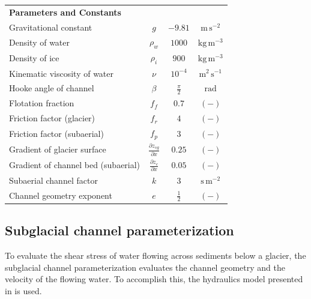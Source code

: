 \documentclass[11pt]{article}
\newcommand{\unit}[1]{$\mathrm{#1}$}
\begin{document}
\begin{spacing}{1}
\begin{table}[H]
\begin{tabular}{ l  c  c c }
      \textbf{Parameters and Constants}  & & &\\
      Gravitational constant&$g$& $-9.81$&$\mathrm{m\,s^{-2}}$\\
      Density of water & $\rho_w$& $1000$ & $\mathrm{kg\,m^{-3}}$ \\
      Density of ice & $\rho_i$& $900$ & $\mathrm{kg\,m^{-3}}$ \\
      Kinematic viscosity of water &$\nu$& $10^{-4}$& $\mathrm{m^2\,s^{-1}}$\\
      Hooke angle of channel & $\beta$ & $\frac{\pi}{2}$ & \unit{rad}\\
      Flotation fraction & $f_f$&$0.7$& $\mathrm{(-)}$\\
      Friction factor (glacier) & $f_r$ & $4$ & $\mathrm{(-)}$ \\
      Friction factor (subaerial) & $f_p$ & $3$ & $\mathrm{(-)}$\\
      Gradient of glacier surface & $\frac{\partial z_{sg}}{\partial x}$ &$0.25$& $\mathrm{(-)}$\\
      Gradient of channel bed (subaerial) &$\frac{\partial z_c}{\partial x}$ &$0.05$& $\mathrm{(-)}$\\
      Subaerial channel factor & $k$ &$3$ & $\mathrm{s\,m^{-2}}$\\
      Channel geometry exponent &$e$& $\frac{1}{2}$&$\mathrm{(-)}$ \\
      \hline
    \end{tabular}
    \label{table:vpm}
  \end{table}
  
  \subsection{Subglacial channel  parameterization}
  \label{sect:sub_mode}
  To evaluate the shear stress of water flowing across sediments below a glacier, the subglacial channel parameterization evaluates the channel geometry and the velocity of the flowing water.
  To accomplish this, the hydraulics model presented in \citet{delaney2019} is used.
  

\end{spacing}
\end{document}
